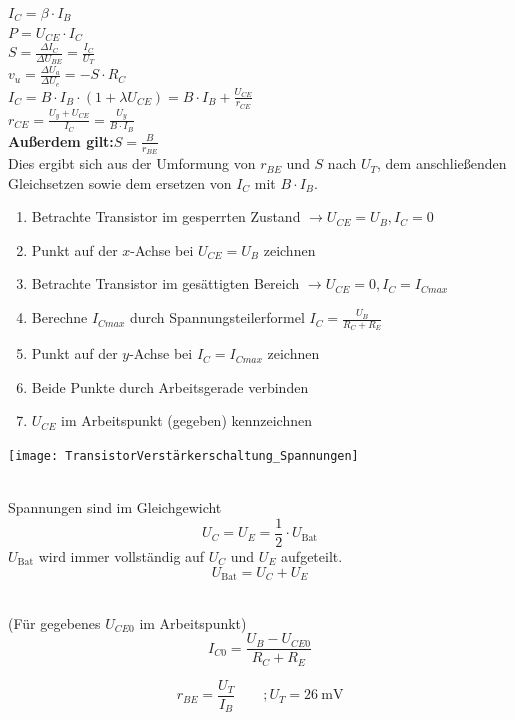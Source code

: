 \documentclass[a5paper, 12pt, twoside]{scrartcl}
\begin{document}
\dotfill\(\displaystyle I_C = \beta \cdot I_B\)\\[1em]
\dotfill\(\displaystyle P = U_{CE} \cdot I_C\)\\[1em]
\dotfill\(\displaystyle S = \frac{\Delta I_C}{\Delta U_{BE}} = \frac{I_C}{U_T}\)\\[1em]
\dotfill\(\displaystyle v_u = \frac{\Delta U_a}{\Delta U_e} = -S \cdot R_C\)\\[1em]
\dotfill\(\displaystyle I_C = B \cdot I_B \cdot (1 + \lambda U_{CE}) = B \cdot I_B + \frac{U_{CE}}{r_{CE}}\)\\[1em]
\dotfill\(\displaystyle r_{CE} = \frac{U_y + U_{CE}}{I_C} = \frac{U_y}{B \cdot I_B}\)\\[1em]
\textbf{\textcolor{myblue}{Außerdem gilt:\dotfill\(\displaystyle S = \frac{B}{r_{BE}}\)}}\\[1em]
\textcolor{myblue}{Dies ergibt sich aus der Umformung von \(r_{BE}\) und \(S\) nach \(U_T\), dem anschließenden Gleichsetzen sowie dem ersetzen von \(I_C\) mit \(B \cdot I_B\).}

\vspace{.5cm}

\begin{enumerate}
\item Betrachte Transistor im gesperrten Zustand \(\rightarrow U_{CE} = U_B, I_C = 0\)
\item Punkt auf der \(x\)-Achse bei \(U_{CE} = U_B\) zeichnen
\item Betrachte Transistor im gesättigten Bereich \(\rightarrow U_{CE} = 0, I_C = I_{Cmax}\)
\item Berechne \(I_{Cmax}\) durch Spannungsteilerformel \(I_C = \frac{U_B}{R_C + R_E}\)
\item Punkt auf der \(y\)-Achse bei \(I_C = I_{Cmax}\) zeichnen
\item Beide Punkte durch Arbeitsgerade verbinden
\item \(U_{CE}\) im Arbeitspunkt (gegeben) kennzeichnen
\end{enumerate}

\clearpage

{\centering
  \texttt{[image: TransistorVerstärkerschaltung\_Spannungen]}
  \par%
}


\\
Spannungen sind im Gleichgewicht
\[U_C = U_E = \frac{1}{2} \cdot U_{\text{Bat}}\]
\(U_{\text{Bat}}\) wird immer vollständig auf \(U_C\) und \(U_E\) aufgeteilt.
\[U_{\text{Bat}} = U_C + U_E\]

\\
(Für gegebenes \(U_{CE0}\) im Arbeitspunkt)
\[I_{C0} = \frac{U_B - U_{CE0}}{R_C + R_E}\]

\[r_{BE} = \frac{U_T}{I_B} \qquad; U_T = \SI{26}{\milli\volt}\]
\end{document}
